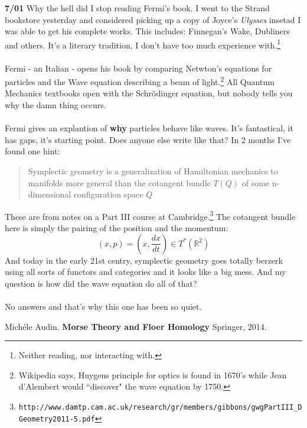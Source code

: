 \documentclass[12pt]{article}
\begin{document}
\newpage

\noindent \textbf{7/01} Why the hell did I stop reading Fermi's book.  I went to the Strand bookstore yesterday and considered picking up a copy of Joyce's \textit{Ulysses}  insetad I was able to get his complete works.  This includes: Finnegan's Wake, Dubliners and others.  It's a literary tradition, I don't have too much experience with.\footnote{Neither reading, nor interacting with.} \\ \\
Fermi - an Italian - opens his book by comparing Netwton's equations for particles and the Wave equation describing a beam of light.\footnote{Wikipedia says, Huygens principle for optics is found in 1670's while Jean d'Alembert would ``discover" the wave equation by 1750.} All Quantum Mechanics textbooks open with the Schr\"{o}dinger equation, but nobody tells you why the damn thing occurs. \\ \\
Fermi gives an explantion of \textbf{why} particles behave like waves.  It's fantastical, it has gaps, it's starting point. Does anyone else write like that?  In 2 months I've found one hint:
\begin{quotation}
Symplectic geometry is a generalization of Hamiltonian mechanics to manifolds more
general than the cotangent bundle $T(Q)$ of some n-dimensional configuration space $Q$
\end{quotation}
These are from notes on a Part III course at Cambridge.\footnote{\texttt{http://www.damtp.cam.ac.uk/research/gr/members/gibbons/gwgPartIII\_{}DGeometry2011-5.pdf}} The cotangent bundle here is simply the pairing of the position and the momentum:
$$ (x, p)  = ( x, \frac{dx}{dt}) \in T^\ast (\mathbb{R}^2) $$
And today in the early 21st centry, symplectic geometry goes totally berzerk using all sorts of functors and categories and it looks like a big mess.  And my question is how did the wave equation do all of that? \\ \\
No answers and that's why this one has been so quiet.

\vfill 

\begin{thebibliography}{}

\item Mich\'{e}le Audin.  \textbf{Morse Theory and Floer Homology} Springer, 2014.

\end{thebibliography}
\end{document}
